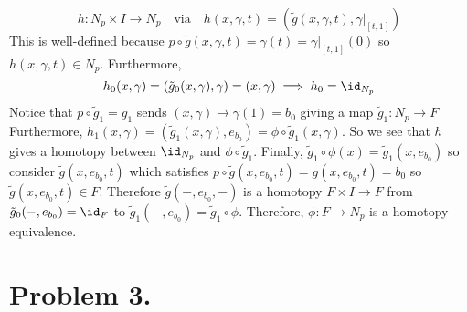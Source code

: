 \documentclass[12pt]{extarticle}
\begin{document}
\[ h : N_p \times I \to N_p \quad \text{via} \quad h(x, \gamma, t) = (\tilde{g}(x, \gamma, t), \gamma|_{[t, 1]}) \]
This is well-defined because $p \circ \tilde{g}(x, \gamma, t) = \gamma(t) = \gamma|_{[t, 1]}(0)$ so $h(x, \gamma, t) \in N_p$. Furthermore, 
\[ h_0(x, \gamma) = (\tilde{g}_0(x, \gamma), \gamma) = (x, \gamma) \implies h_0 = \id_{N_p} \]
Notice that $p \circ \tilde{g}_1 = g_1$ sends $(x, \gamma) \mapsto \gamma(1) = b_0$ giving a map $\tilde{g}_1 : N_p \to F$
Furthermore, $h_1(x, \gamma) = (\tilde{g}_1(x, \gamma), e_{b_0}) = \phi \circ \tilde{g}_1(x, \gamma)$. So we see that $h$ gives a homotopy between $\id_{N_p}$ and $\phi \circ \tilde{g}_1$. Finally, $\tilde{g}_1 \circ \phi(x) = \tilde{g}_1(x, e_{b_0})$ so consider $\tilde{g}(x, e_{b_0}, t)$ which satisfies $p \circ \tilde{g}(x, e_{b_0}, t) = g(x, e_{b_0}, t) = b_0$ so $\tilde{g}(x, e_{b_0}, t) \in F$. Therefore $\tilde{g}(-, e_{b_0}, -)$ is a homotopy $F \times I \to F$ from $\tilde{g}_0(-, e_{b_0}) = \id_F$ to $\tilde{g}_1(-, e_{b_0}) = \tilde{g}_1 \circ \phi$. Therefore, $\phi : F \to N_p$ is a homotopy equivalence.

\section*{Problem 3.}
\end{document}
